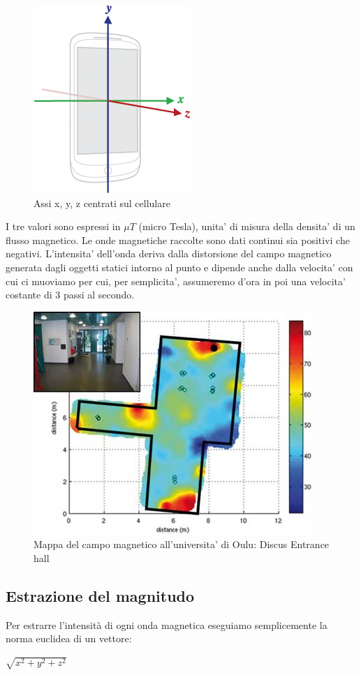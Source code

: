 \begin{figure}[H]
	\centering
	\includegraphics[width=0.20\linewidth]{./img/axis_magnetic_field.png}
	\caption{Assi x, y, z centrati sul cellulare}
	\label{fig:axis_magnetic_field}
\end{figure}


I tre valori sono espressi in $ \mu T $ (micro Tesla), unita' di misura della densita' di un flusso magnetico.
Le onde magnetiche raccolte sono dati continui sia positivi che negativi. L'intensita' dell'onda deriva dalla distorsione del campo magnetico generata dagli oggetti statici intorno al punto e dipende anche dalla velocita' con cui ci muoviamo per cui, per semplicita', assumeremo d'ora in poi una velocita' costante di 3 passi al secondo.

\begin{figure}[H]
	\centering
	\includegraphics[width=0.7\linewidth]{img/magnetic_field_map}
	\caption[Un esempio di mappa del campo magnetico]{Mappa del campo magnetico all'universita' di Oulu: Discus Entrance hall}
	\label{fig:magneticfieldmap}
\end{figure}


\subsection*{Estrazione del magnitudo}
Per estrarre l'intensit\`{a} di ogni onda magnetica eseguiamo semplicemente la norma euclidea di un vettore:\\
\begin{center}
	$ \sqrt{x^2 + y^2 + z^2}$
\end{center}

